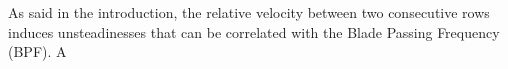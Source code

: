 
As said in the introduction, the relative
velocity between two consecutive rows induces
unsteadinesses that can be correlated with the 
Blade Passing Frequency (BPF). A 